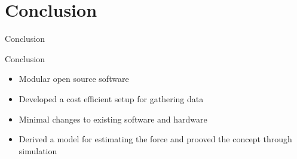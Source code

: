 \section{Conclusion}

\begin{frame}{Conclusion}{}


\end{frame}

\begin{frame}{Conclusion}{}

  \begin{itemize}
    \item Modular open source software
    \item Developed a cost efficient setup for gathering data
    \item Minimal changes to existing software and hardware
    \item Derived a model for estimating the force and prooved the concept through simulation
  \end{itemize}


\end{frame}



